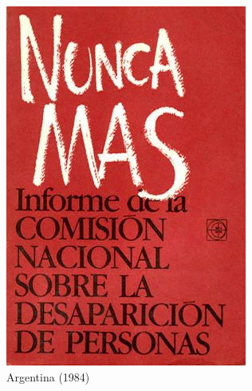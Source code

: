 \documentclass[aspectratio=43]{beamer}
\begin{document}
\begin{frame}
\frametitle{}
\centering

\begin{minipage}{.49\textwidth}\centering
\includegraphics[width = \textwidth]{img/argentina_nuncamas}\\Argentina (1984)
\end{minipage}\hfill
\begin{minipage}{.49\textwidth}\centering

\end{minipage}
\end{frame}
\end{document}
